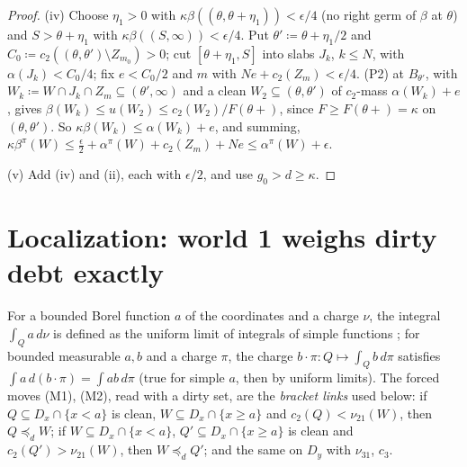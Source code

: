 \documentclass[11pt]{article}
\theoremstyle{definition}\newtheorem{definition}[theorem]{Definition}
\theoremstyle{remark}\newtheorem{remark}[theorem]{Remark}
\begin{document}
\begin{proof}
(iv) Choose $\eta_1>0$ with $\kappa\beta((\theta,\theta+\eta_1))<\epsilon/4$
(no right germ of $\beta$ at $\theta$) and $S>\theta+\eta_1$ with
$\kappa\beta((S,\infty))<\epsilon/4$. Put $\theta'\coloneqq\theta+\eta_1/2$
and $C_0\coloneqq c_2((\theta,\theta')\setminus Z_{m_0})>0$; cut
$[\theta+\eta_1,S]$ into slabs $J_k$, $k\le N$, with $\alpha(J_k)<C_0/4$; fix
$e<C_0/2$ and $m$ with $Ne+c_2(Z_m)<\epsilon/4$. (P2) at $B_{\theta'}$, with
$W_k\coloneqq W\cap J_k\cap Z_m\subseteq(\theta',\infty)$ and a clean
$W_2\subseteq(\theta,\theta')$ of $c_2$-mass $\alpha(W_k)+e$, gives
$\beta(W_k)\le u(W_2)\le c_2(W_2)/F(\theta+)$, since $F\ge F(\theta+)=\kappa$
on $(\theta,\theta')$. So $\kappa\beta(W_k)\le\alpha(W_k)+e$, and summing,
$\kappa\beta^\pi(W)\le\frac\epsilon2+\alpha^\pi(W)+c_2(Z_m)+Ne\le
\alpha^\pi(W)+\epsilon$.

(v) Add (iv) and (ii), each with $\epsilon/2$, and use $g_0>d\ge\kappa$.
\end{proof}

\section{Localization: world 1 weighs dirty debt exactly}\label{sec:local}

For a bounded Borel function $a$ of the coordinates and a charge $\nu$, the
integral $\int_Qa\,d\nu$ is defined as the uniform limit of integrals of
simple functions \cite[Chapter~4]{RR}; for bounded measurable $a,b$ and a
charge $\pi$, the charge $b\cdot\pi\colon Q\mapsto\int_Qb\,d\pi$ satisfies
$\int a\,d(b\cdot\pi)=\int ab\,d\pi$ (true for simple $a$, then by uniform
limits). The forced moves (M1), (M2), read with a dirty set, are the
\emph{bracket links} used below: if $Q\subseteq D_x\cap\{x<a\}$ is clean,
$W\subseteq D_x\cap\{x\ge a\}$ and $c_2(Q)<\nu_{21}(W)$, then $Q\preceq_dW$;
if $W\subseteq D_x\cap\{x<a\}$, $Q'\subseteq D_x\cap\{x\ge a\}$ is clean and
$c_2(Q')>\nu_{21}(W)$, then $W\preceq_dQ'$; and the same on $D_y$ with
$\nu_{31}$, $c_3$.
\end{document}
